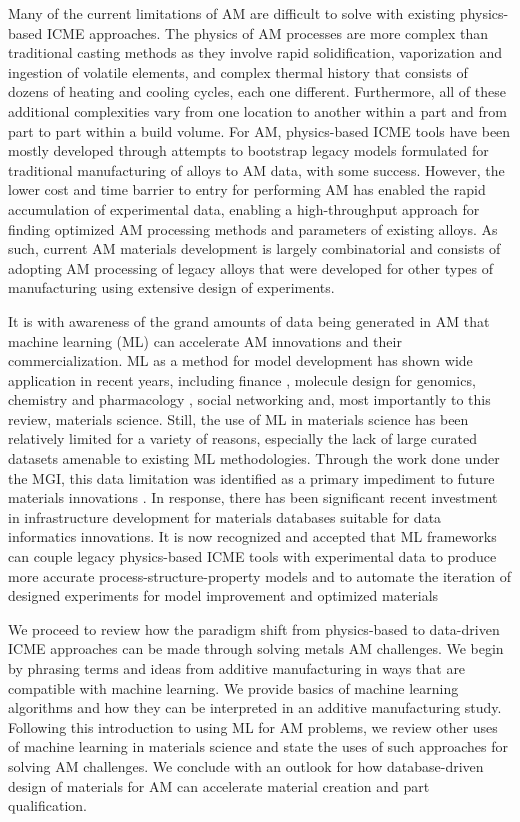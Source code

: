 Many of the current limitations of AM are difficult to solve with existing physics-based ICME approaches. The physics of AM processes are more complex than traditional casting methods as they involve rapid solidification, vaporization and ingestion of volatile elements, and complex thermal history that consists of dozens of heating and cooling cycles, each one different. Furthermore, all of these additional complexities vary from one location to another within a part and from part to part within a build volume. For AM, physics-based ICME tools have been mostly developed through attempts to bootstrap legacy models formulated for traditional manufacturing of alloys to AM data, with some success. However, the lower cost and time barrier to entry for performing AM has enabled the rapid accumulation of experimental data, enabling a high-throughput approach for finding optimized AM processing methods and parameters of existing alloys. As such, current AM materials development is largely combinatorial and consists of adopting AM processing of legacy alloys that were developed for other types of manufacturing using extensive design of experiments.

It is with awareness of the grand amounts of data being generated in AM that machine learning (ML) can accelerate AM innovations and their commercialization. ML as a method for model development has shown wide application in recent years, including finance \cite{Bose2001}, molecule design for genomics, chemistry and pharmacology \cite{Gomez-Bombarelli2018}, social networking \cite{Brusilovsky2007} and, most importantly to this review, materials science. Still, the use of ML in materials science has been relatively limited for a variety of reasons, especially the lack of large curated datasets amenable to existing ML methodologies. Through the work done under the MGI, this data limitation was identified as a primary impediment to future materials innovations \cite{MGI}. In response, there has been significant recent investment in infrastructure development for materials databases suitable for data informatics innovations. It is now recognized and accepted that ML frameworks can couple legacy physics-based ICME tools with experimental data to produce more accurate process-structure-property models and to automate the iteration of designed experiments for model improvement and optimized materials \cite{Rajan2005, Agrawal2016, Butler2018, Ball2019}

We proceed to review how the paradigm shift from physics-based to data-driven ICME approaches can be made through solving metals AM challenges. We begin by phrasing terms and ideas from additive manufacturing in ways that are compatible with machine learning. We provide basics of machine learning algorithms and how they can be interpreted in an additive manufacturing study. Following this introduction to using ML for AM problems, we review other uses of machine learning in materials science and state the uses of such approaches for solving AM challenges. We conclude with an outlook for how database-driven design of materials for AM can accelerate material creation and part qualification.
